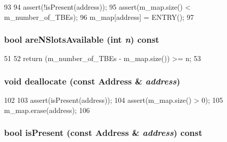 \begin{DoxyCode}
93 {
94     assert(!isPresent(address));
95     assert(m_map.size() < m_number_of_TBEs);
96     m_map[address] = ENTRY();
97 }
\end{DoxyCode}
\hypertarget{classTBETable_ae13afb1718bd58354c590c13e8e7f42f}{
\subsubsection[{areNSlotsAvailable}]{\setlength{\rightskip}{0pt plus 5cm}bool areNSlotsAvailable (int {\em n}) const}}
\label{classTBETable_ae13afb1718bd58354c590c13e8e7f42f}



\begin{DoxyCode}
51     {
52         return (m_number_of_TBEs - m_map.size()) >= n;
53     }
\end{DoxyCode}
\hypertarget{classTBETable_ad1a3e4943cc214363839148c7d94d6a4}{
\subsubsection[{deallocate}]{\setlength{\rightskip}{0pt plus 5cm}void deallocate (const {\bf Address} \& {\em address})}}
\label{classTBETable_ad1a3e4943cc214363839148c7d94d6a4}



\begin{DoxyCode}
102 {
103     assert(isPresent(address));
104     assert(m_map.size() > 0);
105     m_map.erase(address);
106 }
\end{DoxyCode}
\hypertarget{classTBETable_afd5a917773820c248524ea40d6931646}{
\subsubsection[{isPresent}]{\setlength{\rightskip}{0pt plus 5cm}bool isPresent (const {\bf Address} \& {\em address}) const}}
\label{classTBETable_afd5a917773820c248524ea40d6931646}




